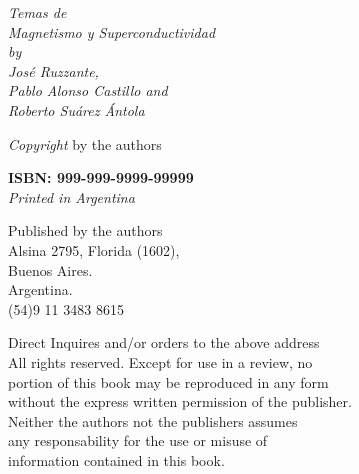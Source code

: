 \documentclass[
11pt, %
spanish,
singlespacing, %
parskip, %
headsepline, %
]{MastersDoctoralThesis} %
\begin{document}






\newpage
\begin{flushleft}
\begin{small}

\vspace{10.0cm} 

\vfill

\textit{Temas de \\ Magnetismo y Superconductividad \\
by \\
José Ruzzante, \\ %
Pablo Alonso Castillo and \\ %
Roberto Suárez Ántola}
\vspace{5mm} 

\textit{Copyright}  by the authors
\vspace{5mm} 

\textbf{ISBN: 999-999-9999-99999} \\
\textit{Printed in Argentina}
\vspace{5mm} 

Published by the authors\\ 
Alsina 2795, Florida (1602),\\
Buenos Aires.\\
Argentina.\\
(54)9 11 3483 8615
\vspace{5mm} 

Direct Inquires and/or orders to the above address\\
\vspace{5mm} 
All rights reserved. Except for use in a review, no\\
portion of this book may be reproduced in any form\\
without the express written permission of the publisher.\\
\vspace{5mm} 
Neither the authors not the publishers assumes\\
any responsability for the use or misuse of\\
information contained in this book.\\


\end{small}
\end{flushleft} 
\end{document}

